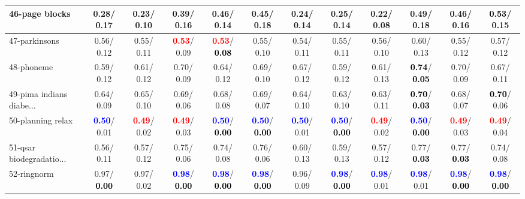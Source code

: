 \begin{table}[h]
\begin{center}
{\begin{tabular}{lc|c|c|c|c|c|c|c|c|c|c}
46-page blocks &   0.28/  0.17 &   0.23/  0.10 &   0.39/  0.16 &   0.46/  0.14 &   0.45/  0.18 &   0.24/  0.14 &   0.25/  0.14 &   0.22/  0.08 &   0.49/  0.18 &   0.46/  0.16 & \textcolor{black}{\textbf{  0.53}}/  0.15 \\ \hline
47-parkinsons &   0.56/  0.12 &   0.55/  0.11 & \textcolor{red}{\textbf{  0.53}}/  0.09 & \textcolor{red}{\textbf{  0.53}}/\textcolor{black}{\textbf{  0.08}} &   0.55/  0.10 &   0.54/  0.11 &   0.55/  0.11 &   0.56/  0.10 &   0.60/  0.13 &   0.55/  0.12 &   0.57/  0.12 \\
48-phoneme &   0.59/  0.12 &   0.61/  0.12 &   0.70/  0.09 &   0.64/  0.12 &   0.69/  0.10 &   0.67/  0.12 &   0.59/  0.12 &   0.61/  0.13 & \textcolor{black}{\textbf{  0.74}}/\textcolor{black}{\textbf{  0.05}} &   0.70/  0.09 &   0.67/  0.11 \\
49-pima indians diabe... &   0.64/  0.09 &   0.65/  0.10 &   0.69/  0.06 &   0.68/  0.08 &   0.69/  0.07 &   0.64/  0.10 &   0.63/  0.10 &   0.63/  0.11 & \textcolor{black}{\textbf{  0.70}}/\textcolor{black}{\textbf{  0.03}} &   0.68/  0.07 & \textcolor{black}{\textbf{  0.70}}/  0.06 \\
50-planning relax & \textcolor{blue}{\textbf{  0.50}}/  0.01 & \textcolor{red}{\textbf{  0.49}}/  0.02 & \textcolor{red}{\textbf{  0.49}}/  0.03 & \textcolor{blue}{\textbf{  0.50}}/\textcolor{black}{\textbf{  0.00}} & \textcolor{blue}{\textbf{  0.50}}/\textcolor{black}{\textbf{  0.00}} & \textcolor{blue}{\textbf{  0.50}}/  0.01 & \textcolor{blue}{\textbf{  0.50}}/\textcolor{black}{\textbf{  0.00}} & \textcolor{red}{\textbf{  0.49}}/  0.02 & \textcolor{blue}{\textbf{  0.50}}/\textcolor{black}{\textbf{  0.00}} & \textcolor{red}{\textbf{  0.49}}/  0.03 & \textcolor{red}{\textbf{  0.49}}/  0.04 \\
51-qsar biodegradatio... &   0.56/  0.11 &   0.57/  0.12 &   0.75/  0.06 &   0.74/  0.08 &   0.76/  0.06 &   0.60/  0.13 &   0.59/  0.13 &   0.57/  0.12 &   0.77/\textcolor{black}{\textbf{  0.03}} &   0.77/\textcolor{black}{\textbf{  0.03}} &   0.74/  0.08 \\
52-ringnorm &   0.97/\textcolor{black}{\textbf{  0.00}} &   0.97/  0.02 & \textcolor{blue}{\textbf{  0.98}}/\textcolor{black}{\textbf{  0.00}} & \textcolor{blue}{\textbf{  0.98}}/\textcolor{black}{\textbf{  0.00}} & \textcolor{blue}{\textbf{  0.98}}/\textcolor{black}{\textbf{  0.00}} &   0.96/  0.09 & \textcolor{blue}{\textbf{  0.98}}/\textcolor{black}{\textbf{  0.00}} & \textcolor{blue}{\textbf{  0.98}}/  0.01 & \textcolor{blue}{\textbf{  0.98}}/  0.01 & \textcolor{blue}{\textbf{  0.98}}/\textcolor{black}{\textbf{  0.00}} & \textcolor{blue}{\textbf{  0.98}}/\textcolor{black}{\textbf{  0.00}} \\

\end{tabular}}
\end{center}
\end{table}
